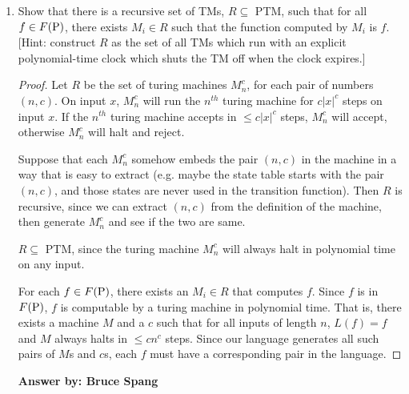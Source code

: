 \documentclass[12pt]{article}
\begin{document}
\begin{enumerate}
{\bf Answer by: Lite Ye} 

\item Show that there is a recursive set of TMs, $R \subseteq$ PTM, such that for all $f \in F(\mbox{{\rm P}})$,
  there exists $M_i \in R$ such that the function computed by $M_i$ is $f$.  [Hint:  construct $R$
    as the set of all TMs which run with an explicit polynomial-time clock which shuts the TM off
    when the clock expires.]

\begin{proof}
  Let $R$ be the set of turing machines $M_n^c$, for each pair of numbers $(n, c)$. On input $x$, $M_n^c$ will run the $n^{th}$ turing machine for $c|x|^c$ steps on input $x$. If the $n^{th}$ turing machine accepts in $\leq c|x|^c$ steps, $M_n^c$ will accept, otherwise $M_n^c$ will halt and reject.

  Suppose that each $M_n^c$ somehow embeds the pair $(n,c)$ in the machine in a way that is easy to extract (e.g. maybe the state table starts with the pair $(n,c)$, and those states are never used in the transition function). Then $R$ is recursive, since we can extract $(n, c)$ from the definition of the machine, then generate $M_n^c$ and see if the two are same.

  $R \subseteq$ PTM, since the turing machine $M_n^c$ will always halt in polynomial time on any input.

  For each $f \in F(\mbox{{\rm P}})$, there exists an $M_i \in R$ that computes $f$. Since $f$ is in $F(\mbox{{\rm P}})$, $f$ is computable by a turing machine in polynomial time. That is, there exists a machine $M$ and a $c$ such that for all inputs of length $n$, $L(f) = f$ and $M$ always halts in $\leq cn^c$ steps. Since our language generates all such pairs of $M$s and $c$s, each $f$ must have a corresponding pair in the language.
\end{proof}

{\bf Answer by: Bruce Spang} 

\end{enumerate}
\end{document}
